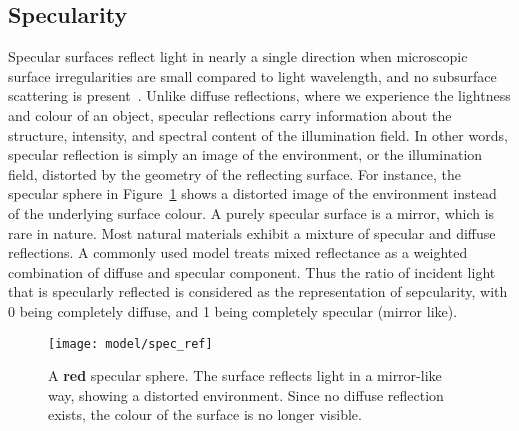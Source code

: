 
\subsection{Specularity}
Specular surfaces reflect light in nearly a single direction when microscopic surface irregularities are small compared to light wavelength, and no subsurface scattering is present~\cite{nayar1989surface}. Unlike diffuse reflections, where we experience the lightness and colour of an object, specular reflections carry information about the structure, intensity, and spectral content of the illumination field. In other words, specular reflection is simply an image of the environment, or the illumination field, distorted by the geometry of the reflecting surface. For instance, the specular sphere in Figure~\ref{fig:spec_ref} shows a distorted image of the environment instead of the underlying surface colour. A purely specular surface is a mirror, which is rare in nature. Most natural materials exhibit a mixture of specular and diffuse reflections. A commonly used model treats mixed reflectance as a weighted combination of diffuse and specular component. Thus the ratio of incident light that is specularly reflected is considered as the representation of sepcularity, with 0 being completely diffuse, and 1 being completely specular (mirror like).
\begin{figure}[!htbp]
\centering
\texttt{[image: model/spec\_ref]}
\caption{A \textbf{red} specular sphere. The surface reflects light in a mirror-like way, showing a distorted environment. Since no diffuse reflection exists, the colour of the surface is no longer visible.}
\label{fig:spec_ref}
\end{figure}

